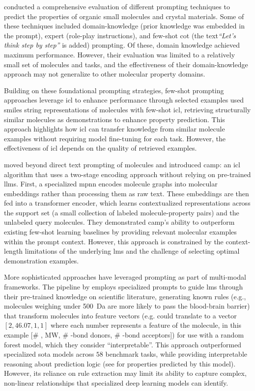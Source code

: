 \textcite{liu2025integrating} conducted a comprehensive evaluation of different prompting techniques to predict the properties of organic small molecules and crystal materials. 
Some of these techniques included domain-knowledge (prior knowledge was embedded in the prompt), expert (role-play instructions), and few-shot \gls{cot} (the text\textit{\enquote{Let's think step by step}} is added) prompting. 
Of these, domain knowledge achieved maximum performance. However, their evaluation was limited to a relatively small set of molecules and tasks, and the effectiveness of their domain-knowledge approach may not generalize to other molecular property domains.

Building on these foundational prompting strategies, few-shot prompting approaches leverage \gls{icl} to enhance performance through selected examples \textcite{liu2024moleculargpt} used \gls{smiles} string representations of molecules with few-shot \gls{icl}, retrieving structurally similar molecules as demonstrations to enhance property prediction. 
This approach highlights how \gls{icl} can transfer knowledge from similar molecule examples without requiring model fine-tuning for each task. 
However, the effectiveness of \gls{icl} depends on the quality of retrieved examples.

\textcite{fifty2023incontext} moved beyond direct text prompting of molecules and introduced \gls{camp}: an \gls{icl} algorithm that uses a two-stage encoding approach without relying on pre-trained \glspl{llm}.
First, a specialized \gls{mpnn} encodes molecule graphs into molecular embeddings rather than processing them as raw text. 
These embeddings are then fed into a transformer encoder, which learns contextualized representations across the support set (a small collection of labeled molecule-property pairs) and the unlabeled query molecules. They demonstrated \gls{camp}'s ability to outperform existing few-shot learning baselines by providing relevant molecular examples within the prompt context. However, this approach is constrained by the context-length limitations of the underlying \glspl{lm} and the challenge of selecting optimal demonstration examples.

More sophisticated approaches have leveraged prompting as part of multi-modal frameworks. The  pipeline by \textcite{zheng2025large} employs specialized prompts to guide \glspl{lm} through their pre-trained knowledge on scientific literature, generating known rules (e.g., molecules weighing under \SI{500}{Da} are more likely to pass the blood-brain barrier) that transform molecules into feature vectors (e.g.  could translate to a vector $[2,46.07,1,1]$ where each number represents a feature of the molecule, in this example [\# , MW, \# -bond donors, \# -bond acceptors]) for use with a random forest model, which they consider \enquote{interpretable}. 
This approach outperformed specialized \gls{sota} models across $58$ benchmark tasks, while providing interpretable reasoning about prediction logic (see  for properties predicted by this model). However, its reliance on rule extraction may limit its ability to capture complex, non-linear relationships that specialized deep learning models can identify.

